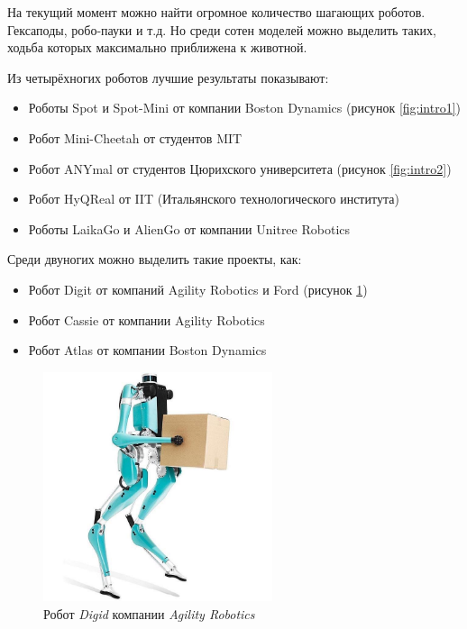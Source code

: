 На текущий момент можно найти огромное количество шагающих роботов. Гексаподы, робо-пауки и т.д. Но среди сотен моделей можно выделить таких, ходьба которых максимально приближена к животной.

Из четырёхногих роботов лучшие результаты показывают:
\begin{itemize}
    \item Роботы Spot и Spot-Mini от компании Boston Dynamics (рисунок \ref{fig:intro1})
    \item Робот Mini-Cheetah от студентов MIT
    \item Робот ANYmal от студентов Цюрихского университета (рисунок \ref{fig:intro2})
    \item Робот HyQReal от IIT (Итальянского технологического института)
    \item Роботы LaikaGo и AlienGo от компании Unitree Robotics
\end{itemize}

Среди двуногих можно выделить такие проекты, как:

\begin{itemize}
    \item Робот Digit от компаний Agility Robotics и Ford (рисунок \ref{fig:intro3})
    \item Робот Cassie от компании Agility Robotics
    \item Робот Atlas от компании Boston Dynamics
\end{itemize}

\begin{figure}[h]
    \centering
    \includegraphics[width=0.6\textwidth]{chapter_intro/figure3.jpg}
    \caption{Робот \textit{Digid} компании \textit{ Agility Robotics}}
    \label{fig:intro3}
\end{figure}

